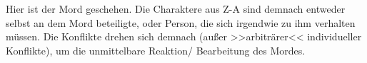 Hier ist der Mord geschehen. Die Charaktere aus Z-A sind demnach entweder selbst
an dem Mord beteiligte, oder Person, die sich irgendwie zu ihm verhalten müssen.
Die Konflikte drehen sich demnach (außer >>arbiträrer<< individueller Konflikte),
um die unmittelbare Reaktion/ Bearbeitung des Mordes.
